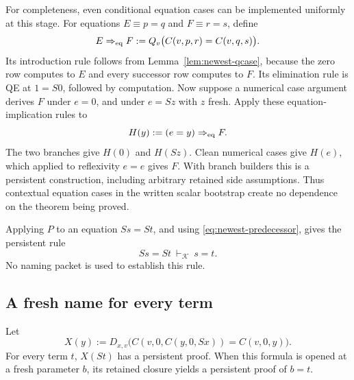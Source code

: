 For completeness, even conditional equation cases can be implemented
uniformly at this stage. For equations $E\equiv p=q$ and $F\equiv r=s$,
define
\[
 E\Rightarrow_{\rm eq} F
 :=Q_v\bigl(C(v,p,r)=C(v,q,s)\bigr).
\]
Its introduction rule follows from Lemma~\ref{lem:newest-qcase}, because
the zero row computes to $E$ and every successor row computes to $F$.
Its elimination rule is QE at $1=S0$, followed by computation.
Now suppose a numerical case argument derives $F$ under $e=0$, and
under $e=Sz$ with $z$ fresh. Apply these equation-implication rules to
\[
 H(y):=(e=y)\Rightarrow_{\rm eq}F.
\]
The two branches give $H(0)$ and $H(Sz)$. Clean numerical cases give
$H(e)$, which applied to reflexivity $e=e$ gives $F$. With branch
builders this is a persistent construction, including arbitrary retained
side assumptions. Thus contextual equation cases in the written scalar
bootstrap create no dependence on the theorem being proved.

Applying $P$ to an equation $Ss=St$, and using
\eqref{eq:newest-predecessor}, gives the persistent rule
\begin{equation}
 Ss=St\ \vdash_{\mathcal K}\ s=t.
 \label{eq:newest-injective}
\end{equation}
No naming packet is used to establish this rule.

\subsection{A fresh name for every term}

\begin{lemma}
\label{lem:newest-name}
Let
\begin{equation}
 X(y):=D_{x,v}
 \bigl(C(v,0,C(y,0,Sx))=C(v,0,y)\bigr).
 \label{eq:newest-packet}
\end{equation}
For every term $t$, $X(St)$ has a persistent proof. When this formula
is opened at a fresh parameter $b$, its retained closure yields a
persistent proof of $b=t$.
\end{lemma}

